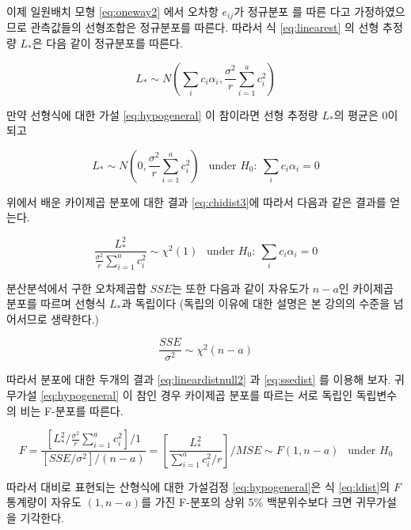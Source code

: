 \documentclass[
]{book}
\begin{document}
이제 일원배치 모형 \eqref{eq:oneway2} 에서 오차항 \(e_{ij}\)가 정규분포 를 따른 다고 가정하였으므로 관측값들의 선형조합은 정규분포를 따른다. 따라서 식 \eqref{eq:linearest} 의 선형 추정량 \(L_*\)은 다음 같이 정규분포를 따른다.

\begin{equation}
L_* \sim N \left ( \sum_i c_i \alpha_i, \frac{\sigma^2}{r} \sum_{i=1}^a c_i^2 \right )
\label{eq:lineardist}
\end{equation}

만약 선형식에 대한 가설 \eqref{eq:hypogeneral} 이 참이라면 선형 추정량 \(L_*\)의 평균은 0이 되고

\begin{equation}
L_* \sim N \left (0,  \frac{\sigma^2}{r} \sum_{i=1}^a c_i^2\right )~~ \text{ under } H_0: ~  \sum_i c_i \alpha_i =0
\label{eq:lineardistnull}
\end{equation}

위에서 배운 카이제곱 분포에 대한 결과 \eqref{eq:chidist3}에 따라서 다음과 같은 결과를 얻는다.

\begin{equation}
\frac{L_*^2}{\tfrac{\sigma^2}{r} \sum_{i=1}^a c_i^2 } \sim \chi^2(1) ~~\text{ under } H_0: ~  \sum_i c_i \alpha_i =0
\label{eq:lineardistnull2}
\end{equation}

분산분석에서 구한 오차제곱합 \(SSE\)는 또한 다음과 같이 자유도가 \(n-a\)인 카이제곱 분포를 따르며 선형식 \(L_*\)과 독립이다 (독립의 이유에 대한 설명은 본 강의의 수준을 넘어서므로 생략한다.)

\begin{equation}
\frac{SSE}{\sigma^2} \sim \chi^2(n-a) 
\label{eq:ssedist}
\end{equation}

따라서 분포에 대한 두개의 결과 \eqref{eq:lineardistnull2} 과 \eqref{eq:ssedist} 를 이용해 보자. 귀무가설 \eqref{eq:hypogeneral} 이 참인 경우 카이제곱 분포를 따르는 서로 독립인 독립변수의 비는 F-분포를 따른다.

\begin{equation}
F = \frac{  \left [ L_*^2 / \tfrac{\sigma^2}{r} \sum_{i=1}^a c_i^2 \right ] /1} { \left [ SSE/ \sigma^2  \right ] / (n-a)}
=  \left[ \frac{L_*^2}{\sum_{i=1}^a c_i^2/r } \right ] / MSE  \sim F(1, n-a) ~~\text{ under } H_0
\label{eq:ldist}
\end{equation}

따라서 대비로 표현되는 산형식에 대한 가설검정 \eqref{eq:hypogeneral}은 식 \eqref{eq:ldist}의 \(F\) 통계량이
자유도 \((1,n-a)\)를 가진 F-분포의 상위 5\% 백분위수보다 크면 귀무가설을 기각한다.
\end{document}
